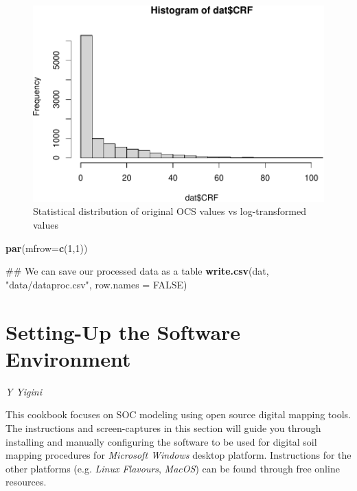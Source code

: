 \documentclass[10pt,b5paper,]{book}
\newenvironment{Shaded}{\begin{snugshade}}{\end{snugshade}}
\newcommand{\DataTypeTok}[1]{\textcolor[rgb]{0.13,0.29,0.53}{#1}}
\newcommand{\DecValTok}[1]{\textcolor[rgb]{0.00,0.00,0.81}{#1}}
\newcommand{\KeywordTok}[1]{\textcolor[rgb]{0.13,0.29,0.53}{\textbf{#1}}}
\newcommand{\NormalTok}[1]{#1}
\newcommand{\OtherTok}[1]{\textcolor[rgb]{0.56,0.35,0.01}{#1}}
\newcommand{\StringTok}[1]{\textcolor[rgb]{0.31,0.60,0.02}{#1}}
\theoremstyle{definition}
\theoremstyle{definition}
\theoremstyle{definition}
\theoremstyle{remark}
\begin{document}
\begin{figure}
\centering
\includegraphics{SOCMapping_files/figure-latex/unnamed-chunk-9-1.pdf}
\caption{\label{fig:unnamed-chunk-9}Statistical distribution of original OCS
values vs log-transformed values}
\end{figure}

\begin{Shaded}
\begin{Highlighting}[]
\KeywordTok{par}\NormalTok{(}\DataTypeTok{mfrow=}\KeywordTok{c}\NormalTok{(}\DecValTok{1}\NormalTok{,}\DecValTok{1}\NormalTok{))}

\NormalTok{## We can save our processed data as a table}
\KeywordTok{write.csv}\NormalTok{(dat, }\StringTok{"data/dataproc.csv"}\NormalTok{, }\DataTypeTok{row.names =} \OtherTok{FALSE}\NormalTok{)}
\end{Highlighting}
\end{Shaded}

\hypertarget{setting-up-the-software-environment}{%
\chapter{Setting-Up the Software
Environment}\label{setting-up-the-software-environment}}

\emph{Y Yigini}

This cookbook focuses on SOC modeling using open source digital mapping
tools. The instructions and screen-captures in this section will guide
you through installing and manually configuring the software to be used
for digital soil mapping procedures for \emph{Microsoft Windows} desktop
platform. Instructions for the other platforms (e.g. \emph{Linux
Flavours}, \emph{MacOS}) can be found through free online resources.
\end{document}
